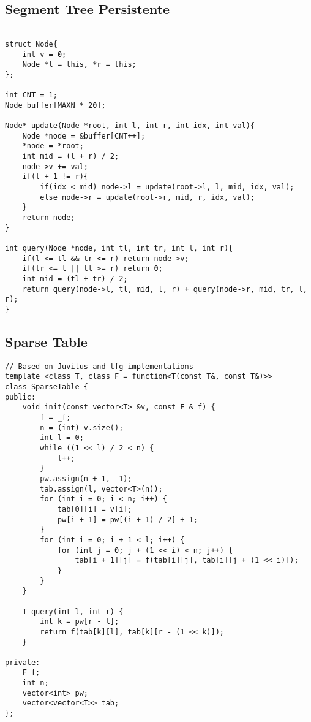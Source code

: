 \documentclass[12pt, a4paper, twoside]{article}
\begin{document}
\subsection{Segment Tree Persistente
}
\begin{lstlisting}

struct Node{
	int v = 0;
	Node *l = this, *r = this;
};

int CNT = 1;
Node buffer[MAXN * 20];
 
Node* update(Node *root, int l, int r, int idx, int val){
	Node *node = &buffer[CNT++];
	*node = *root;
	int mid = (l + r) / 2;
	node->v += val;
	if(l + 1 != r){
		if(idx < mid) node->l = update(root->l, l, mid, idx, val);
		else node->r = update(root->r, mid, r, idx, val);
	}
	return node;
}
 
int query(Node *node, int tl, int tr, int l, int r){
	if(l <= tl && tr <= r) return node->v;
	if(tr <= l || tl >= r) return 0;
	int mid = (tl + tr) / 2;
	return query(node->l, tl, mid, l, r) + query(node->r, mid, tr, l, r);
}
\end{lstlisting}

\subsection{Sparse Table
}
\begin{lstlisting}
// Based on Juvitus and tfg implementations
template <class T, class F = function<T(const T&, const T&)>>
class SparseTable {
public:
	void init(const vector<T> &v, const F &_f) {
		f = _f;
		n = (int) v.size();
		int l = 0;
		while ((1 << l) / 2 < n) {
			l++;
		}
		pw.assign(n + 1, -1);
		tab.assign(l, vector<T>(n));
		for (int i = 0; i < n; i++) {
			tab[0][i] = v[i];
			pw[i + 1] = pw[(i + 1) / 2] + 1;
		}
		for (int i = 0; i + 1 < l; i++) {
			for (int j = 0; j + (1 << i) < n; j++) {
				tab[i + 1][j] = f(tab[i][j], tab[i][j + (1 << i)]);
			}
		}
	}

	T query(int l, int r) {
		int k = pw[r - l];
		return f(tab[k][l], tab[k][r - (1 << k)]);
	}

private:
	F f;
	int n;
	vector<int> pw;
	vector<vector<T>> tab;
};
\end{lstlisting}
\end{document}
